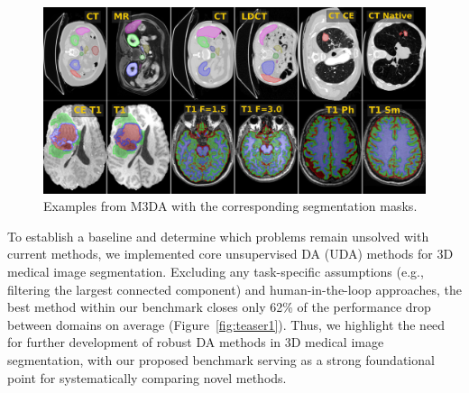 \begin{figure}[h]
	\centering
	\includegraphics[width=1\linewidth]{Dissertation/Figures/4_da_bench/fig2_bench_contours.png}
	\caption{Examples from M3DA with the corresponding segmentation masks.}%
	\label{fig:contours}
\end{figure}

To establish a baseline and determine which problems remain unsolved with current methods, we implemented core unsupervised DA (UDA) methods for 3D medical image segmentation. Excluding any task-specific assumptions (e.g., filtering the largest connected component) and human-in-the-loop approaches, the best method within our benchmark closes only 62\% of the performance drop between domains on average (Figure~\ref{fig:teaser1}). Thus, we highlight the need for further development of robust DA methods in 3D medical image segmentation, with our proposed benchmark serving as a strong foundational point for systematically comparing novel methods.%

%	
%	
%	
%	


